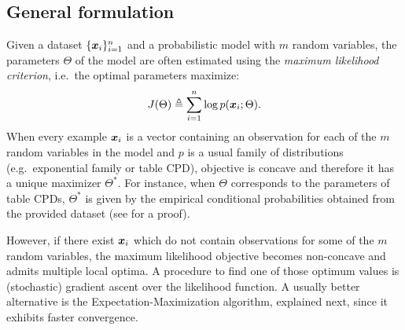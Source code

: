 \subsection{General formulation}
\label{sec:general_em}
Given a dataset $\lbrace {\bm{x}}_i \rbrace_{i=1}^n$ and a probabilistic model with $m$ random variables, the parameters $\Theta$ of the model are often estimated using the \emph{maximum likelihood criterion}, i.e.\ the optimal parameters maximize:
\begin{equation}
    \label{eq:maximum_likelihood}
    J(\Theta) \triangleq \sum_{i=1}^n \log p({\bm{x}}_i; \Theta).
\end{equation}
When every example ${\bm{x}}_i$ is a vector containing an observation for each of the $m$ random variables in the model and $p$ is a usual family of distributions (e.g.\ exponential family or table CPD), objective  is concave and therefore it has a unique maximizer $\Theta^*$. For instance, when $\Theta$ corresponds to the parameters of table CPDs, $\Theta^*$ is given by the empirical conditional probabilities obtained from the provided dataset (see \citet{Koller2009} for a proof).

However, if there exist ${\bm{x}}_i$ which do not contain observations for some of the $m$ random variables, the maximum likelihood objective becomes non-concave and admits multiple local optima. A procedure to find one of those optimum values is (stochastic) gradient ascent over the likelihood function. A usually better alternative is the Expectation-Maximization algorithm, explained next, since it exhibits faster convergence.

